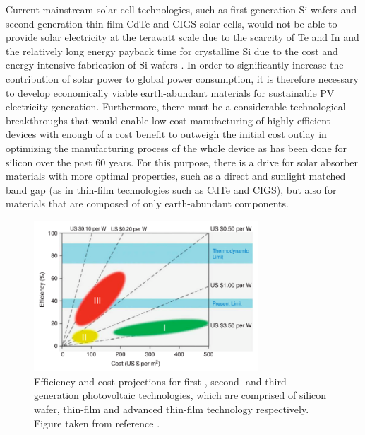 Current mainstream solar cell technologies, such as first-generation Si wafers and second-generation thin-film CdTe and CIGS solar cells, would not be able to provide solar electricity at the terawatt scale due to the scarcity of Te and In and the relatively long energy payback time for crystalline Si due to the cost and energy intensive fabrication of Si wafers \cite{CZTS_vs_MAPI}. In order to significantly increase the contribution of solar power to global power consumption, it is therefore necessary to develop economically viable earth-abundant materials for sustainable PV electricity generation. Furthermore, there must be a considerable technological breakthroughs that would enable low-cost manufacturing of highly efficient devices with enough of a cost benefit to outweigh the initial cost outlay in optimizing the manufacturing process of the whole device as has been done for silicon over the past 60 years. For this purpose, there is a drive for solar absorber materials with more optimal properties, such as a direct and sunlight matched band gap (as in thin-film technologies such as CdTe and CIGS), but also for materials that are composed of only earth-abundant components. 


\begin{figure}[h!]
  \centering
    \includegraphics[width=0.75\textwidth]{figures/PV_generations.png}
    \caption{Efficiency and cost projections for first-, second- and third-generation photovoltaic technologies, which are comprised of silicon wafer, thin-film and advanced thin-film technology respectively. Figure 
 taken from reference .}
  \label{PV_generations}
\end{figure}

